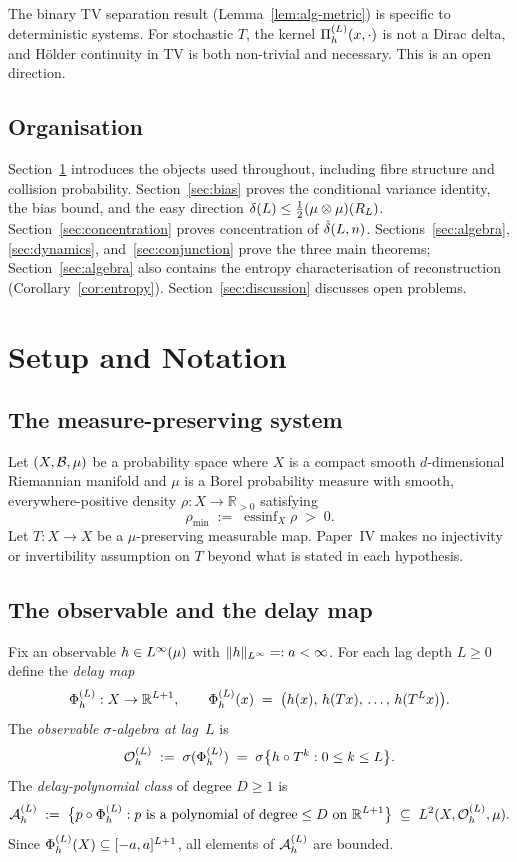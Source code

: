 The binary TV separation result (Lemma~\ref{lem:alg-metric}) is specific to
deterministic systems.
For stochastic $T$, the kernel $\Pi_h^{(L)}(x, \cdot)$ is not a Dirac delta, and
Hölder continuity in TV is both non-trivial and necessary.
This is an open direction.

\subsection{Organisation}

Section~\ref{sec:setup} introduces the objects used throughout, including
fibre structure and collision probability.
Section~\ref{sec:bias} proves the conditional variance identity, the bias bound,
and the easy direction $\delta(L) \leq \tfrac{1}{2}(\mu\otimes\mu)(R_L)$.
Section~\ref{sec:concentration} proves concentration of $\hat{\delta}(L,n)$.
Sections~\ref{sec:algebra}, \ref{sec:dynamics}, and~\ref{sec:conjunction}
prove the three main theorems; Section~\ref{sec:algebra} also contains the
entropy characterisation of reconstruction (Corollary~\ref{cor:entropy}).
Section~\ref{sec:discussion} discusses open problems.

\section{Setup and Notation}
\label{sec:setup}

\subsection{The measure-preserving system}

Let $(X, \mathcal{B}, \mu)$ be a probability space where $X$ is a compact smooth
$d$-dimensional Riemannian manifold and $\mu$ is a Borel probability measure
with smooth, everywhere-positive density $\rho : X \to \mathbb{R}_{>0}$
satisfying
\[
  \rho_{\min} \;:=\; \operatorname{essinf}_X \rho \;>\; 0.
\]
Let $T : X \to X$ be a $\mu$-preserving measurable map.
Paper~IV makes no injectivity or invertibility assumption on $T$ beyond what
is stated in each hypothesis.

\subsection{The observable and the delay map}

Fix an observable $h \in L^{\infty}(\mu)$ with $\|h\|_{L^{\infty}} =: a < \infty$.
For each lag depth $L \geq 0$ define the \emph{delay map}
\[
  \Phi_h^{(L)} : X \to \mathbb{R}^{L+1},
  \qquad
  \Phi_h^{(L)}(x) \;=\; \bigl(h(x),\, h(Tx),\, \ldots,\, h(T^L x)\bigr).
\]
The \emph{observable $\sigma$-algebra at lag~$L$} is
\[
  \mathcal{O}_h^{(L)} \;:=\; \sigma(\Phi_h^{(L)}) \;=\; \sigma\bigl\{h \circ T^k : 0 \leq k \leq L\bigr\}.
\]
The \emph{delay-polynomial class} of degree $D \geq 1$ is
\[
  \mathcal{A}_h^{(L)} \;:=\;
  \bigl\{p \circ \Phi_h^{(L)} : p \text{ is a polynomial of degree} \leq D \text{ on }
  \mathbb{R}^{L+1}\bigr\} \;\subseteq\; L^{2}(X, \mathcal{O}_h^{(L)}, \mu).
\]
Since $\Phi_h^{(L)}(X) \subseteq [-a,a]^{L+1}$, all elements of $\mathcal{A}_h^{(L)}$ are bounded.

